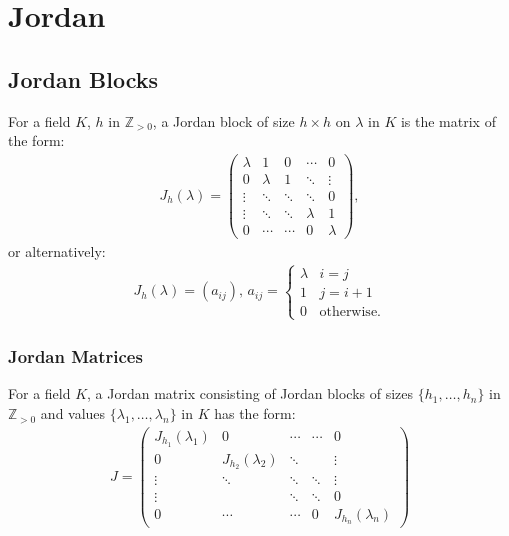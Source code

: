 \section{Jordan}

\subsection{Jordan Blocks}

For a field $K$, $h$ in $\mathbb{Z}_{> 0}$, a Jordan block of size 
$h \times h$
on $\lambda$ in $K$ is the matrix of the form: \begin{gather*}
  J_h(\lambda) = \begin{pmatrix}
    \lambda & 1       & 0      & \cdots  & 0       \\
    0       & \lambda & 1      & \ddots  & \vdots  \\
    \vdots  & \ddots  & \ddots & \ddots  & 0       \\
    \vdots  & \ddots  & \ddots & \lambda & 1       \\
    0       & \cdots  & \cdots & 0       & \lambda
  \end{pmatrix},
\end{gather*} or alternatively: \begin{gather*}
  J_h(\lambda) = (a_{ij}), \, a_{ij} = \begin{cases}
    \lambda & i = j \\
    1       & j = i + 1 \\
    0       & \text{otherwise.}
  \end{cases}
\end{gather*}

\subsubsection{Jordan Matrices}

For a field $K$, a Jordan matrix consisting of Jordan blocks of sizes 
$\{h_1, \ldots, h_n\}$ in $\mathbb{Z}_{>0}$ and values 
$\{\lambda_1, \ldots, \lambda_n\}$ in $K$ has the form: \begin{gather*}
  J = \begin{pmatrix}
    J_{h_1}(\lambda_1) & 0                  & \cdots & \cdots & 0      \\
    0                  & J_{h_2}(\lambda_2) & \ddots &        & \vdots \\
    \vdots             & \ddots             & \ddots & \ddots & \vdots \\
    \vdots             &                    & \ddots & \ddots & 0      \\
    0                  & \cdots             & \cdots & 0      & J_{h_n}(\lambda_n)
  \end{pmatrix}
\end{gather*}

